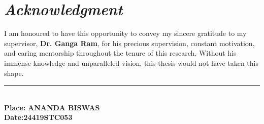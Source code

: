 \vspace*{3em}
\section*{\centering \huge \textit{Acknowledgment}}
\vspace{3em}
I am honoured to have this opportunity to convey my sincere gratitude to my supervisor, \textbf{Dr. Ganga Ram}, for his precious supervision, constant motivation, and caring mentorship throughout the tenure of this research. Without his immense knowledge and unparalleled vision, this thesis would not have taken this shape.
\vspace{5em}
\begin{flushright}
	\rule[.1em]{12em}{1pt}\\
	\textbf{Place:} \hfill \textbf{ANANDA BISWAS}\\
	\textbf{Date:}\hfill \textbf{24419STC053}
\end{flushright}
\clearpage